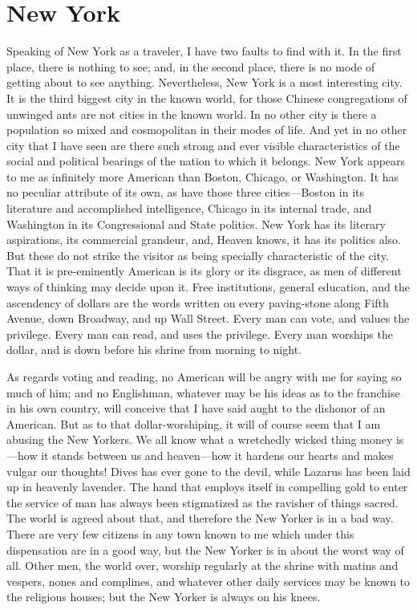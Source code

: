 \chapter{New York}


Speaking of New York as a traveler, I have two faults to find with
it.  In the first place, there is nothing to see; and, in the
second place, there is no mode of getting about to see anything.
Nevertheless, New York is a most interesting city.  It is the third
biggest city in the known world, for those Chinese congregations of
unwinged ants are not cities in the known world.  In no other city
is there a population so mixed and cosmopolitan in their modes of
life.  And yet in no other city that I have seen are there such
strong and ever visible characteristics of the social and political
bearings of the nation to which it belongs.  New York appears to me
as infinitely more American than Boston, Chicago, or Washington.
It has no peculiar attribute of its own, as have those three
cities---Boston in its literature and accomplished intelligence,
Chicago in its internal trade, and Washington in its Congressional
and State politics.  New York has its literary aspirations, its
commercial grandeur, and, Heaven knows, it has its politics also.
But these do not strike the visitor as being specially
characteristic of the city.  That it is pre-eminently American is
its glory or its disgrace, as men of different ways of thinking may
decide upon it.  Free institutions, general education, and the
ascendency of dollars are the words written on every paving-stone
along Fifth Avenue, down Broadway, and up Wall Street.  Every man
can vote, and values the privilege.  Every man can read, and uses
the privilege.  Every man worships the dollar, and is down before
his shrine from morning to night.

As regards voting and reading, no American will be angry with me
for saying so much of him; and no Englishman, whatever may be his
ideas as to the franchise in his own country, will conceive that I
have said aught to the dishonor of an American.  But as to that
dollar-worshiping, it will of course seem that I am abusing the New
Yorkers.  We all know what a wretchedly wicked thing money is---how
it stands between us and heaven---how it hardens our hearts and
makes vulgar our thoughts!  Dives has ever gone to the devil, while
Lazarus has been laid up in heavenly lavender.  The hand that
employs itself in compelling gold to enter the service of man has
always been stigmatized as the ravisher of things sacred.  The
world is agreed about that, and therefore the New Yorker is in a
bad way.  There are very few citizens in any town known to me which
under this dispensation are in a good way, but the New Yorker is in
about the worst way of all.  Other men, the world over, worship
regularly at the shrine with matins and vespers, nones and
complines, and whatever other daily services may be known to the
religious houses; but the New Yorker is always on his knees.

